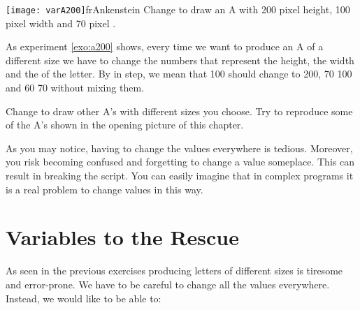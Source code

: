 \begin{exofigwithsizeandtitle}[0.5]{\texttt{[image: varA200]}}{frAnkenstein}\label{exo:a200}
Change \newcommand{\remove}[1]{the}  to draw an A \newcommand{\replace}[2]{of}{with} 200 pixel height, 100
pixel width and 70 pixel \dist.
\end{exofigwithsizeandtitle}


As \newcommand{\remove}[1]{the previous} experiment \ref{exo:a200} shows\newcommand{\remove}[1]{ you}, every \newcommand{\replace}[2]{times}{time} we want to produce an A of a different size we have to change \newcommand{\remove}[1]{\strong{everywhere} and
\strong{synchronously}} the numbers that represent the height, the
width and the \dist of the letter\newcommand{\add}[1]{ \strong{everywhere they occur} and \strong{in step with each other}}. By \newcommand{\replace}[2]{synchronously}{in step}, we mean that 100 should \newcommand{\replace}[2]{become}{change to}
200, 70 \newcommand{\add}[1]{to} 100 and 60 \newcommand{\add}[1]{to} 70 \newcommand{\add}[1]{--- all at once, and} without mixing them\newcommand{\add}[1]{ up}.

\begin{exonofig}
Change \newcommand{\remove}[1]{the}  to draw other \newcommand{\replace}[2]{A letters}{A's} with different
sizes \newcommand{\replace}[2]{of your choice}{you choose}.  Try to reproduce some of the \newcommand{\replace}[2]{As}{A's} \newcommand{\replace}[2]{that compose}{shown in} the opening
picture of this chapter.
\end{exonofig}


As you may notice, having to change the values everywhere is
tedious. Moreover, you \newcommand{\remove}[1]{also may} risk becoming confused and \newcommand{\replace}[2]{forget}{forgetting} to
change a value \newcommand{\replace}[2]{at one place}{someplace}.  This can  result in breaking the
script. You can easily imagine that in complex programs \newcommand{\replace}[2]{this}{it} is
a real problem to change values in \newcommand{\replace}[2]{such a}{this} way.

\section{Variables to the Rescue}
As seen \newcommand{\replace}[2]{with}{in} the previous exercises\newcommand{\add}[1]{,} producing letters of different
\newcommand{\replace}[2]{size}{sizes} is tiresome and \newcommand{\replace}[2]{errorprone}{error-prone}. We have to \newcommand{\replace}[2]{take care}{be careful} to change all
the values everywhere. \newcommand{\replace}[2]{In fact}{Instead}, we would like to be able to:

